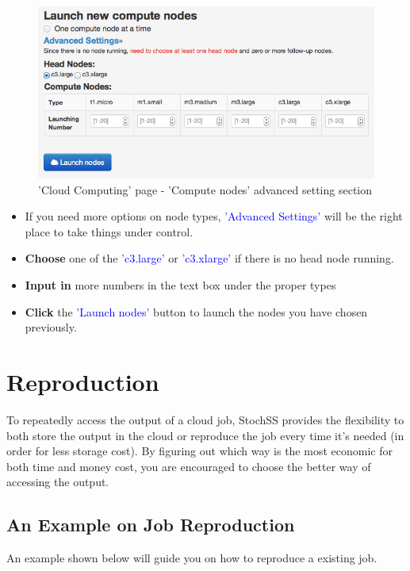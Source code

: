 \begin{figure}[!ht]
\centering
\includegraphics[scale=0.45]{T6/T6_fig_computenode2.png}
\caption{'Cloud Computing' page - 'Compute nodes' advanced setting section}
\label{fig:2}
\end{figure}

\begin{itemize}
\item If you need more options on node types, \textcolor{blue}{'Advanced Settings'} will be the right place to take things under control.
\item \textbf{Choose} one of the \textcolor{blue}{'c3.large'} or \textcolor{blue}{'c3.xlarge'} if there is no head node running.
\item \textbf{Input in} more numbers in the text box under the proper types
\item \textbf{Click} the \textcolor{blue}{'Launch nodes'} button to launch the nodes you have chosen previously.

\end{itemize}

\newpage

\section{Reproduction}
To repeatedly access the output of a cloud job, StochSS provides the flexibility to both store the output in the cloud or reproduce the job every time it's needed (in order for less storage cost). By figuring out which way is the most economic for both time and money cost, you are encouraged to choose the better way of accessing the output.

\subsection{An Example on Job Reproduction}
An example shown below will guide you on how to reproduce a existing job.

